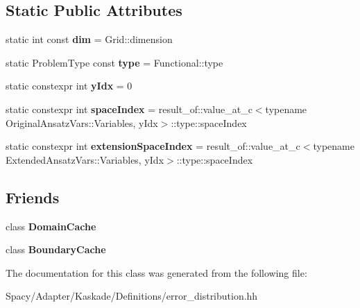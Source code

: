 \subsection*{Static Public Attributes}
\begin{DoxyCompactItemize}
\item 
\hypertarget{classSpacy_1_1Kaskade_1_1ErrorDistribution_a9c25ab92fea23d79d203048f75ed19b1}{}static int const {\bfseries dim} = Grid\+::dimension\label{classSpacy_1_1Kaskade_1_1ErrorDistribution_a9c25ab92fea23d79d203048f75ed19b1}

\item 
\hypertarget{classSpacy_1_1Kaskade_1_1ErrorDistribution_a1aa21778983330a3615628579566db86}{}static Problem\+Type const {\bfseries type} = Functional\+::type\label{classSpacy_1_1Kaskade_1_1ErrorDistribution_a1aa21778983330a3615628579566db86}

\item 
\hypertarget{classSpacy_1_1Kaskade_1_1ErrorDistribution_a2510ab0d41021648f44de94789e9dbeb}{}static constexpr int {\bfseries y\+Idx} = 0\label{classSpacy_1_1Kaskade_1_1ErrorDistribution_a2510ab0d41021648f44de94789e9dbeb}

\item 
\hypertarget{classSpacy_1_1Kaskade_1_1ErrorDistribution_abd08a2e81efe31f5e945d5fac17ff62b}{}static constexpr int {\bfseries space\+Index} = result\+\_\+of\+::value\+\_\+at\+\_\+c$<$typename Original\+Ansatz\+Vars\+::\+Variables, y\+Idx$>$\+::type\+::space\+Index\label{classSpacy_1_1Kaskade_1_1ErrorDistribution_abd08a2e81efe31f5e945d5fac17ff62b}

\item 
\hypertarget{classSpacy_1_1Kaskade_1_1ErrorDistribution_abadb7dbc2aec081b37f0f226ccc80328}{}static constexpr int {\bfseries extension\+Space\+Index} = result\+\_\+of\+::value\+\_\+at\+\_\+c$<$typename Extended\+Ansatz\+Vars\+::\+Variables, y\+Idx$>$\+::type\+::space\+Index\label{classSpacy_1_1Kaskade_1_1ErrorDistribution_abadb7dbc2aec081b37f0f226ccc80328}

\end{DoxyCompactItemize}
\subsection*{Friends}
\begin{DoxyCompactItemize}
\item 
\hypertarget{classSpacy_1_1Kaskade_1_1ErrorDistribution_a918b51c8fef3109afd5f45ccc20e45a8}{}class {\bfseries Domain\+Cache}\label{classSpacy_1_1Kaskade_1_1ErrorDistribution_a918b51c8fef3109afd5f45ccc20e45a8}

\item 
\hypertarget{classSpacy_1_1Kaskade_1_1ErrorDistribution_ae7fb3658f92beb7b11c76472abbadf38}{}class {\bfseries Boundary\+Cache}\label{classSpacy_1_1Kaskade_1_1ErrorDistribution_ae7fb3658f92beb7b11c76472abbadf38}

\end{DoxyCompactItemize}


The documentation for this class was generated from the following file\+:\begin{DoxyCompactItemize}
\item 
Spacy/\+Adapter/\+Kaskade/\+Definitions/error\+\_\+distribution.\+hh\end{DoxyCompactItemize}
